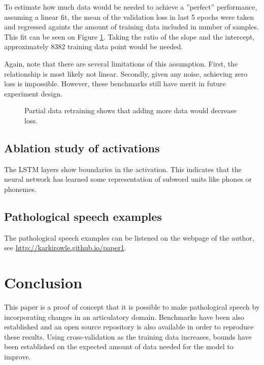 \documentclass[a4paper]{article}
\begin{document}
To estimate how much data would be needed to achieve a ''perfect'' performance,
assuming a linear fit, the mean of the validation loss in last 5 epochs
were taken and regressed againts the amount of training data included in
number of samples. This fit can be seen on Figure \ref{retraining_linear}.
Taking the ratio of the slope and the intercept, approximately 8382
training data point would be needed.

Again, note that there are several limitations of this assumption. First, the
relationship is most likely not linear. Secondly, given any noise, achieving
zero loss is impossible. However, these benchmarks still have merit in
future experiment design.

\begin{figure}[t]
  \begin{center}
    \scalebox{0.50}{}
    \caption{Partial data retraining shows that adding more data would
      decrease loss. }
    \label{retraining_linear}
\end{center}
\end{figure}

\subsection{Ablation study of activations}

The LSTM layers show boundaries in the activation. This indicates that the neural network
has learned some representation of subword units like phones or phonemes.
\subsection{Pathological speech examples}

The pathological speech examples can be listened on the webpage of the
author, see \url{http://karkirowle.github.io/paper1}. 

\section{Conclusion}

This paper is a proof of concept that it is possible to make pathological
speech by incorporating changes in an articulatory domain. Benchmarks
have been also established and an open source repository is also available
in order to reproduce these results. Using cross-validation as the
training data increases, bounds have been established on the expected
amount of data needed for the model to improve.
\end{document}

